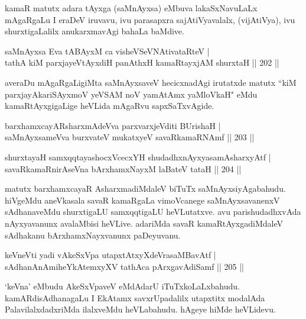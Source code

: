 \begin{artha}
kamaR matutx adara tAyxga (saMnAyxsa) eMbuva lakaSxNavuLaLx mAgaRgaLu I eraDeV iruvavu, ivu parasapxra sajAtiVyavalalx, (vijAtiVya), ivu shurxtigaLalilx anukarxmavAgi bahaLa baMdive.
\end{artha}

\begin{shl}
saMnAyxsa Eva tABAyxM ca visheVSeVNAtivataRteV |\\
tathA kiM parxjayeVtAyxdiH panAthxH kamaRtayxjAM shurxtaH \hfill || 202 ||
\end{shl}

\begin{artha}
averaDu mAgaRgaLigiMta saMnAyxsaveV hecicxnadAgi irutatxde matutx ``kiM  parxjayAkariSAyxmoV yeVSAM noV yamAtAmx yaMloVkaH" eMdu kamaRtAyxgigaLige heVLida mAgaRvu sapxSaTxvAgide.
\end{artha}

\begin{shl}
barxhamxcayARsharxmAdeVva parxvarxjeVditi BUrishaH |\\
saMnAyxsameVva burxvateV mukatxyeV savaRkamaRNAmf \hfill || 203 ||
\end{shl}

\begin{shl}
shurxtayaH samxqqtayashocxVcecxYH shudadhxnAyxyasamAsharxyAtf |\\
savaRkamaRnirAseVna bArxhamxNayxM laBateV tataH \hfill || 204 ||
\end{shl}

\begin{artha}%
matutx barxhamxcayaR AsharxmadiMdaleV biTuTx saMnAyxsiyAgabahudu. hiVgeMdu aneVkasala savaR kamaRgaLa vimoVcanege saMnAyxsavanenxV sAdhanaveMdu shurxtigaLU samxqqtigaLU heVLutatxve. avu parishudadhxvAda nAyxyavanunx avalaMbisi heVLive. adariMda savaR kamaRtAyxgadiMdaleV sAdhakanu bArxhamxNayxvanunx paDeyuvanu.
\end{artha}

\begin{shl}
keVneVti yadi vA\s \s keSxVpa utapxtAtxyXdeVrasaMBavAtf |\\
sAdhanAnAmiheYkAtemxyXV tathAca pArxgavAdiSamf \hfill || 205 ||
\end{shl}

\begin{artha}
`keVna' eMbudu AkeSxVpaveV eMdAdarU iTuTxkoLaLxbahudu. kamARdisAdhanagaLu I EkAtamx savxrUpadalilx utapxtitx modalAda PalavilalxdadxriMda ilalxveMdu heVLabahudu. hAgeye hiMde heVLidevu.
\end{artha}

